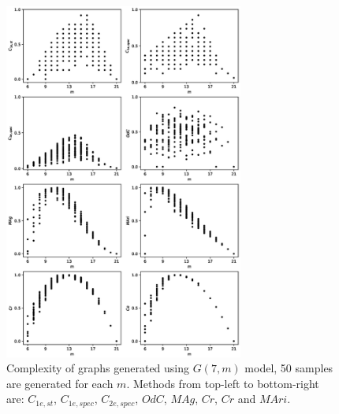 \documentclass[12pt]{article}
\begin{document}
\begin{figure}[ht]
    \includegraphics[width=0.7\textwidth]{complexities.eps}
    \centering
    \caption{Complexity of graphs generated using $G(7,m)$ model, 50 samples are generated for each $m$. Methods from top-left to bottom-right are: $C_{1e,st}$, $C_{1e,spec}$, $C_{2e,spec}$, $OdC$, $MAg$, $Cr$, $Cr$ and $MAri$.}
    \label{fig:small_graphs}
\end{figure}
\end{document}
